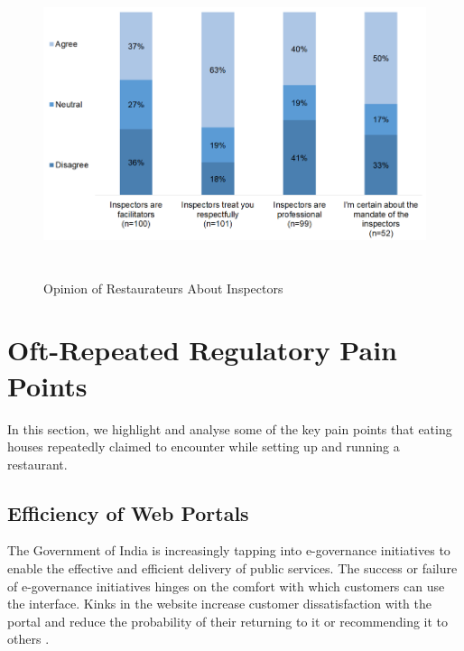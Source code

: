 \documentclass[a4paper, 12pt]{article}
\begin{document}
		\begin{figure}[H]
                    	\centering
                    	\includegraphics[height = 3.5in]{Figure8.png}
                    	\caption[Optional Caption]{Opinion of Restaurateurs About Inspectors} 
		\end{figure}



		\section{Oft-Repeated Regulatory Pain Points}
		\label{sec:3}
		
		In this section, we highlight and analyse some of the key pain points that eating houses repeatedly claimed to encounter while setting up and running a restaurant.
		
		\subsection{Efficiency of Web Portals}
		The Government of India is increasingly tapping into e-governance initiatives to enable the effective and efficient delivery of public services. The success or failure of e-governance initiatives hinges on the comfort with which customers can use the 
interface. Kinks in the website increase customer dissatisfaction with the portal and reduce the probability of their returning to it or recommending it to others \parencite{anthopoulos2007applying}. \\
		
\end{document}
